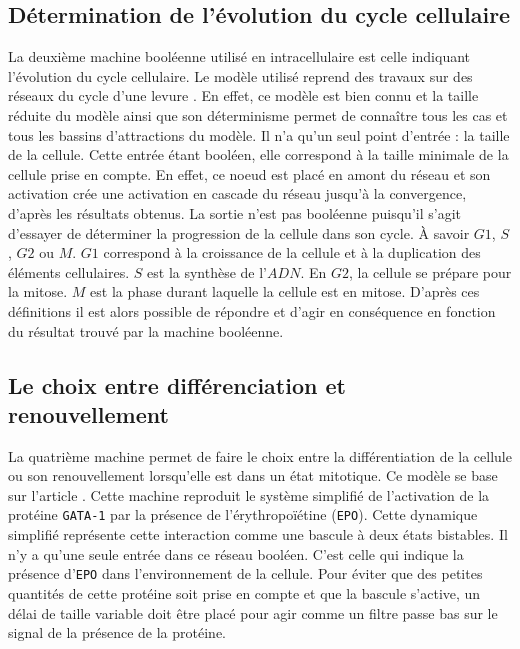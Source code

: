 \documentclass[11pt, a4paper]{article}
\begin{document}
\subsection{Détermination de l'évolution du cycle cellulaire}
La deuxième machine booléenne utilisé en intracellulaire est celle indiquant
l'évolution du cycle cellulaire. Le modèle utilisé reprend des travaux sur des
réseaux du cycle d'une levure \cite{li2004}. En effet, ce modèle est bien connu
et la taille réduite du modèle ainsi que son déterminisme permet de connaître
tous les cas et tous les bassins d'attractions du modèle.  Il n'a qu'un seul
point d'entrée : la taille de la cellule. Cette entrée étant booléen, elle
correspond à la taille minimale de la cellule prise en compte. En effet, ce
noeud est placé en amont du réseau et son activation crée une activation en
cascade du réseau jusqu'à la convergence, d'après les résultats obtenus. La
sortie n'est pas booléenne puisqu'il s'agit d'essayer de déterminer la
progression de la cellule dans son cycle. À savoir $G1$, $S$, $G2$ ou $M$.
$G1$ correspond à la croissance de la cellule et à la duplication des éléments
cellulaires. $S$ est la synthèse de l'$ADN$. En $G2$, la cellule se prépare
pour la mitose. $M$ est la phase durant laquelle la cellule est en mitose.
D'après ces définitions il est alors possible de répondre et d'agir en
conséquence en fonction du résultat trouvé par la machine booléenne.

\subsection{Le choix entre différenciation et renouvellement}
La quatrième machine permet de faire le choix entre la différentiation de la
cellule ou son renouvellement lorsqu'elle est dans un état mitotique. Ce modèle
se base sur l'article \cite{palani2008}. Cette machine reproduit le système
simplifié de l'activation de la protéine \texttt{GATA-1} par la présence de
l'érythropoïétine (\texttt{EPO}). Cette dynamique simplifié représente cette
interaction comme une bascule à deux états bistables. Il n'y a qu'une seule
entrée dans ce réseau booléen. C'est celle qui indique la présence
d'\texttt{EPO} dans l'environnement de la cellule. Pour éviter que des petites
quantités de cette protéine soit prise en compte et que la bascule s'active, un
délai de taille variable doit être placé pour agir comme un filtre passe bas
sur le signal de la présence de la protéine.
\end{document}
